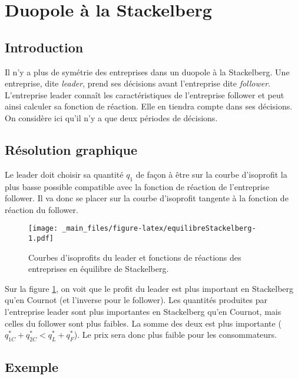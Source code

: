 \documentclass[
]{book}
\theoremstyle{definition}
\theoremstyle{definition}
\theoremstyle{definition}
\theoremstyle{definition}
\theoremstyle{remark}
\begin{document}
\hypertarget{duopole-uxe0-la-stackelberg}{%
\section{Duopole à la Stackelberg}\label{duopole-uxe0-la-stackelberg}}

\hypertarget{introduction-1}{%
\subsection{Introduction}\label{introduction-1}}

Il n'y a plus de symétrie des entreprises dans un duopole à la Stackelberg.
Une entreprise, dite \emph{leader}, prend ses décisions avant l'entreprise dite \emph{follower}.
L'entreprise leader connaît les caractéristiques de l'entreprise follower et peut ainsi calculer sa fonction de réaction.
Elle en tiendra compte dans ses décisions.
On considère ici qu'il n'y a que deux périodes de décisions.

\hypertarget{ruxe9solution-graphique}{%
\subsection{Résolution graphique}\label{ruxe9solution-graphique}}

Le leader doit choisir sa quantité \(q_1\) de façon à être sur la courbe d'isoprofit la plus basse possible compatible avec la fonction de réaction de l'entreprise follower.
Il va donc se placer sur la courbe d'isoprofit tangente à la fonction de réaction du follower.

\begin{figure}
\centering
\texttt{[image: \_main\_files/figure-latex/equilibreStackelberg-1.pdf]}
\caption{\label{fig:equilibreStackelberg}Courbes d'isoprofits du leader et fonctions de réactions des entreprises en équilibre de Stackelberg.}
\end{figure}

Sur la figure \ref{fig:equilibreStackelberg}, on voit que le profit du leader est plus important en Stackelberg qu'en Cournot (et l'inverse pour le follower).
Les quantités produites par l'entreprise leader sont plus importantes en Stackelberg qu'en Cournot, mais celles du follower sont plus faibles.
La somme des deux est plus importante (\(q_{1C}^*+q_{2C}^*<q_{L}^*+q_{F}^*\)).
Le prix sera donc plus faible pour les consommateurs.

\hypertarget{exemple-1}{%
\subsection{Exemple}\label{exemple-1}}
\end{document}
